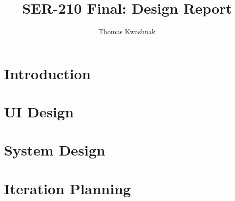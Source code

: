 \documentclass{report}
\title{SER-210 Final: Design Report}
\author{Thomas Kwashnak}
\begin{document}
\maketitle

\tableofcontents
\newpage

\chapter{Introduction}



\chapter{UI Design}

\chapter{System Design}

\chapter{Iteration Planning}
\end{document}
